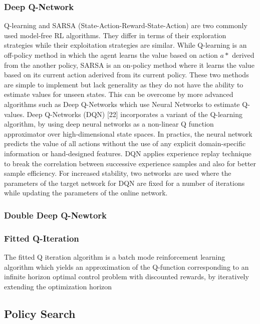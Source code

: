 \subsubsection{Deep Q-Network}
Q-learning and SARSA (State-Action-Reward-State-Action) are two commonly used model-free RL algorithms. They differ in terms of their exploration strategies while their exploitation strategies are similar. While Q-learning is an off-policy method in which the agent learns the value based on action $a*$ derived from the another policy, SARSA is an on-policy method where it learns the value based on its current action aderived from its current policy. These two methods are simple to implement but lack generality as they do not have the ability to estimate values for unseen states.
This can be overcome by more advanced algorithms such as Deep Q-Networks which use Neural Networks to estimate Q-values. 
Deep Q-Networks (DQN) [22] incorporates a variant of the Q-learning algorithm, by using deep neural networks as a non-linear Q function approximator over high-dimensional state spaces. In practics, the neural network predicts the value of all actions without the use of any explicit domain-specific information or hand-designed features. DQN applies experience replay technique to break the correlation between successive experience samples and also for better sample efficiency. For increased stability, two networks are used where the parameters of the target network for DQN are fixed for a number of iterations while updating the parameters of the online network. 

\subsubsection{Double Deep Q-Newtork}


\subsubsection{Fitted Q-Iteration}

The fitted Q iteration algorithm is a batch mode reinforcement learning algorithm which yields
an approximation of the Q-function corresponding to an infinite horizon optimal control problem
with discounted rewards, by iteratively extending the optimization horizon



\subsection{Policy Search}
